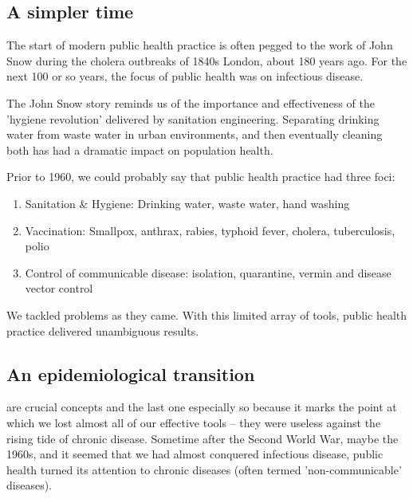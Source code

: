 \subsection{A simpler time}
The start of modern public health practice is often pegged to the work of John Snow during the cholera outbreaks of 1840s London, about 180 years ago. For the next 100 or so years, the focus of public health was on infectious disease.

The John Snow story reminds us of the importance and effectiveness of the 'hygiene revolution' delivered by sanitation engineering. Separating drinking water from waste water in urban environments, and then eventually cleaning both has had a dramatic impact on population health.

Prior to 1960, we could probably say that public health practice had three foci:
\begin{enumerate}
	\item Sanitation \& Hygiene: Drinking water, waste water, hand washing
	\item Vaccination: Smallpox, anthrax, rabies, typhoid fever, cholera, tuberculosis, polio
	\item Control of communicable disease: isolation, quarantine, vermin and disease vector control
\end{enumerate}

We tackled problems as they came. With this limited array of tools, public health practice delivered unambiguous results. 

\subsection{An epidemiological transition}
 are crucial concepts and the last one especially so because it marks the point at which we lost almost all of our effective tools -- they were useless against the rising tide of chronic disease. Sometime after the Second World War, maybe the 1960s, and it seemed that we had almost conquered infectious disease, public health turned its attention to chronic diseases (often termed 'non-communicable' diseases).

